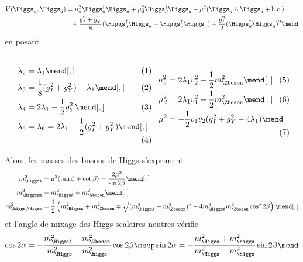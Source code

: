 \begin{align}
V(\Higgs_u,\Higgs_d)
&
=
\mu_u^2\Higgs_u^\dagger\Higgs_u
+
\mu_d^2\Higgs_d^\dagger\Higgs_d
-
\mu^2 (\Higgs_u\wedge\Higgs_d+\text{h.c.})
\nonumber\\
&\hphantom{=}
+
\frac{g_I^2+g_Y^2}{8} (\Higgs_d^\dagger\Higgs_d-\Higgs_u^\dagger\Higgs_u)
+
\frac{g_I^2}{2} (\Higgs_d^\dagger\Higgs_u)^2
\mend
\end{align}
en posant
\vspace{-.5\baselineskip}\par\noindent
\begin{subequations}
\noindent
\begin{minipage}[c]{.49\textwidth}
\begin{align}
\lambda_2 &= \lambda_1 \mend[,]\\
\lambda_3 &= \frac{1}{8} (g_I^2+g_Y^2)-\lambda_1 \mend[,]\\
\lambda_4 &= 2\lambda_1 - \frac{1}{2} g_Y^2 \mend[,]\\
\lambda_5 &= \lambda_6 = 2\lambda_1 - \frac{1}{2}(g_I^2+g_Y^2) \mend[,]
\end{align}
\end{minipage}
\hfill
\begin{minipage}[c]{.49\textwidth}
\begin{align}
\mu_u^2 &= 2 \lambda_1 v_2^2 - \frac{1}{2} m_{\Zboson}^2 \mend[,]\\
\mu_d^2 &= 2 \lambda_1 v_1^2 - \frac{1}{2} m_{\Zboson}^2 \mend[,]\\
\mu^2 &= -\frac{1}{2}v_1v_2(g_I^2+g_Y^2-4\lambda_1)
\mend
\end{align}
\end{minipage}
\end{subequations}
\vspace{.5\baselineskip}\par\noindent
Alors, les masses des bosons de Higgs s'expriment
\begin{align}
m_{\HiggsA}^2 &= \mu^2 (\tan\beta+\cot\beta) = \frac{2\mu^2}{\sin 2\beta}
\mend[,]\\
m_{\Higgspm}^2 &= m_{\HiggsA}^2+m_{\Wboson}^2
\mend[,]\\
m_{\higgs,\Higgs}^2 &= \frac{1}{2} \left( m_{\HiggsA}^2+m_{\Zboson}^2 \mp \sqrt{(m_{\HiggsA}^2+m_{\Zboson}^2)^2-4m_{\HiggsA}^2m_{\Zboson}^2\cos^2 2\beta} \right)
\mend[,]
\end{align}
et l'angle de mixage des Higgs scalaires neutres vérifie
\begin{equation}
\cos 2\alpha = - \frac{m_{\HiggsA}^2-m_{\Zboson}^2}{m_{\Higgs}^2-m_{\higgs}^2} \cos 2\beta
\msep
\sin 2\alpha = - \frac{m_{\Higgs}^2+m_{\higgs}^2}{m_{\Higgs}^2-m_{\higgs}^2} \sin 2\beta
\mend
\end{equation}

